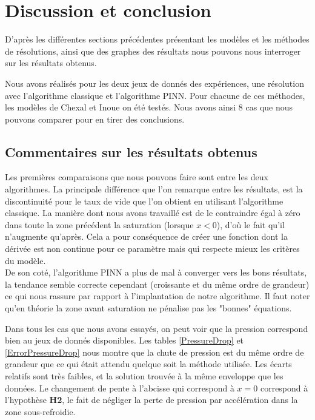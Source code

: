 \section{Discussion et conclusion}
D'après les différentes sections précédentes présentant les modèles et les méthodes de résolutions, ainsi que des graphes des résultats nous pouvons nous interroger sur les résultats obtenus.\\ \par

Nous avons réalisés pour les deux jeux de donnés des expériences, une résolution avec l'algorithme classique et l'algorithme PINN. Pour chacune de ces méthodes, les modèles de Chexal et Inoue on été testés. Nous avons ainsi 8 cas que nous pouvons comparer pour en tirer des conclusions.
\subsection{Commentaires sur les résultats obtenus}
Les premières comparaisons que nous pouvons faire sont entre les deux algorithmes. La principale différence que l'on remarque entre les résultats, est la discontinuité pour le taux de vide que l'on obtient en utilisant l'algorithme classique. La manière dont nous avons travaillé est de le contraindre égal à zéro dans toute la zone précédent la saturation (lorsque $x<0$), d'où le fait qu'il n'augmente qu'après. Cela a pour conséquence de créer une fonction dont la dérivée est non continue pour ce paramètre mais qui respecte mieux les critères du modèle.\\

De son coté, l'algorithme PINN a plus de mal à converger vers les bons résultats, la tendance semble correcte cependant (croissante et du même ordre de grandeur) ce qui nous rassure par rapport à l'implantation de notre algorithme. Il faut noter qu'en théorie la zone avant saturation ne pénalise pas les "bonnes" équations.\\ \par

Dans tous les cas que nous avons essayés, on peut voir que la pression correspond bien au jeux de donnés disponibles. 
Les tables \ref{PressureDrop} et \ref{ErrorPressureDrop} nous montre que la chute de pression est du même ordre de grandeur que ce qui était attendu quelque soit la méthode utilisée. Les écarts relatifs sont très faibles, et la solution trouvée à la même enveloppe que les données. Le changement de pente à l'abcisse qui correspond à $x=0$ correspond à l'hypothèse \textbf{H2}, le fait de négliger la perte de pression par accélération dans la zone sous-refroidie.\\


